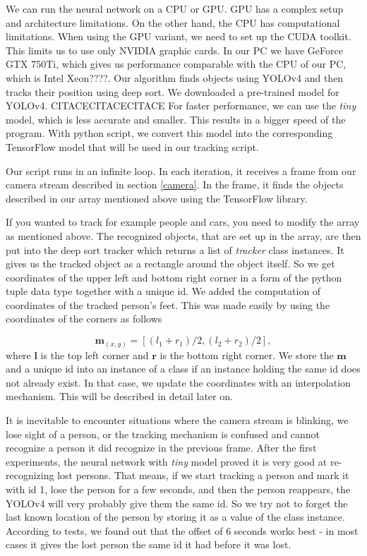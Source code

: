 \documentclass{ctuthesis}
\begin{document}
We can run the neural network on a CPU or GPU. GPU has a complex setup and architecture limitations. On the other hand, the CPU has computational limitations. When using the GPU variant, we need to set up the CUDA toolkit. This limits us to use only NVIDIA graphic cards. In our PC we have GeForce GTX 750Ti, which gives us performance comparable with the CPU of our PC, which is Intel Xeon????. Our algorithm finds objects using YOLOv4 and then tracks their position using deep sort. We downloaded a pre-trained model for YOLOv4. CITACECITACECITACE For faster performance, we can use the \textit{tiny} model, which is less accurate and smaller. This results in a bigger speed of the program. With python script, we convert this model into the corresponding TensorFlow model that will be used in our tracking script.

Our script runs in an infinite loop. In each iteration, it receives a frame from our camera stream described in section \ref{camera}. In the frame, it finds the objects described in our array mentioned above using the TensorFlow library.

If you wanted to track for example people and cars, you need to modify the array as mentioned above. The recognized objects, that are set up in the array, are then put into the deep sort tracker which returns a list of \textit{tracker} class instances. It gives us the tracked object as a rectangle around the object itself. So we get coordinates of the upper left and bottom right corner in a form of the python tuple data type together with a unique id. We added the computation of coordinates of the tracked person's feet. This was made easily by using the coordinates of the corners as follows

\begin{equation}
\textbf{m}_{(x, y)} = [(l_1 + r_1)/2, (l_2 + r_2)/2],
\end{equation}
where \(\textbf{l}\) is the top left corner and \(\textbf{r}\) is the bottom right corner. We store the \(\textbf{m}\) and a unique id into an instance of a class if an instance holding the same id does not already exist. In that case, we update the coordinates with an interpolation mechanism. This will be described in detail later on.

It is inevitable to encounter situations where the camera stream is blinking, we lose sight of a person, or the tracking mechanism is confused and cannot recognize a person it did recognize in the previous frame. After the first experiments, the neural network with \textit{tiny} model proved it is very good at re-recognizing lost persons. That means, if we start tracking a person and mark it with id 1, lose the person for a few seconds, and then the person reappears, the YOLOv4 will very probably give them the same id. So we try not to forget the last known location of the person by storing it as a value of the class instance. According to tests, we found out that the offset of 6 seconds works best - in most cases it gives the lost person the same id it had before it was lost. 
\end{document}
